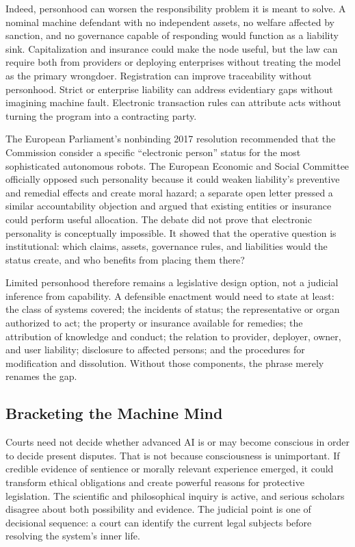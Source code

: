 Indeed, personhood can worsen the responsibility problem it is meant to solve. A nominal machine defendant with no independent assets, no welfare affected by sanction, and no governance capable of responding would function as a liability sink. Capitalization and insurance could make the node useful, but the law can require both from providers or deploying enterprises without treating the model as the primary wrongdoer. Registration can improve traceability without personhood. Strict or enterprise liability can address evidentiary gaps without imagining machine fault. Electronic transaction rules can attribute acts without turning the program into a contracting party.

The European Parliament's nonbinding 2017 resolution recommended that the Commission consider a specific ``electronic person'' status for the most sophisticated autonomous robots. The European Economic and Social Committee officially opposed such personality because it could weaken liability's preventive and remedial effects and create moral hazard; a separate open letter pressed a similar accountability objection and argued that existing entities or insurance could perform useful allocation. The debate did not prove that electronic personality is conceptually impossible. It showed that the operative question is institutional: which claims, assets, governance rules, and liabilities would the status create, and who benefits from placing them there?

Limited personhood therefore remains a legislative design option, not a judicial inference from capability. A defensible enactment would need to state at least: the class of systems covered; the incidents of status; the representative or organ authorized to act; the property or insurance available for remedies; the attribution of knowledge and conduct; the relation to provider, deployer, owner, and user liability; disclosure to affected persons; and the procedures for modification and dissolution. Without those components, the phrase merely renames the gap.

\subsection{Bracketing the Machine Mind}

Courts need not decide whether advanced AI is or may become conscious in order to decide present disputes. That is not because consciousness is unimportant. If credible evidence of sentience or morally relevant experience emerged, it could transform ethical obligations and create powerful reasons for protective legislation. The scientific and philosophical inquiry is active, and serious scholars disagree about both possibility and evidence. The judicial point is one of decisional sequence: a court can identify the current legal subjects before resolving the system's inner life.

